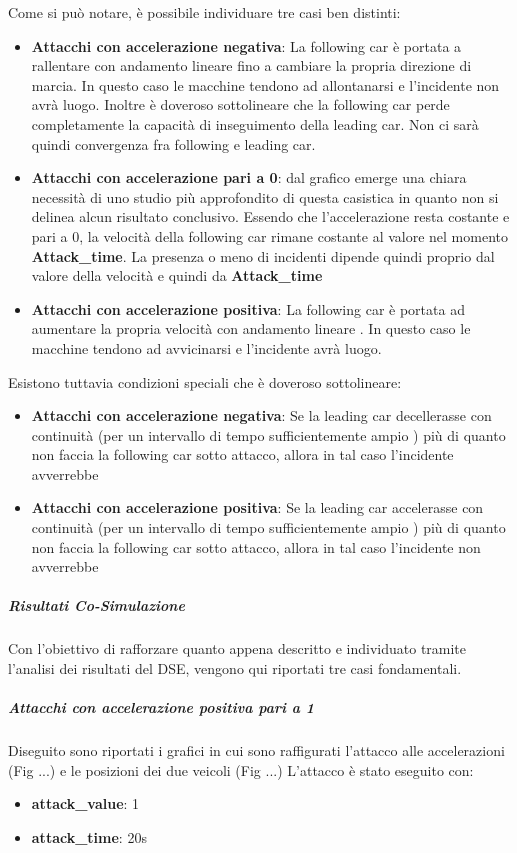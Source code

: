 Come si può notare, è possibile individuare tre casi ben distinti:
\begin{itemize}
	\item \textbf{Attacchi con accelerazione negativa}: La following car è portata a rallentare con andamento lineare fino a cambiare la propria direzione di marcia. In questo caso le macchine tendono ad allontanarsi e l'incidente non avrà luogo. Inoltre è doveroso sottolineare che la following car perde completamente la capacità di inseguimento della leading car. Non ci sarà quindi convergenza fra following e leading car.
	\item \textbf{Attacchi con accelerazione pari a 0}: dal grafico emerge una chiara necessità di uno studio più approfondito di questa casistica in quanto non si delinea alcun risultato conclusivo. Essendo che l'accelerazione resta costante e pari a 0, la velocità della following car rimane costante al valore nel momento \textbf{Attack\_time}. La presenza o meno di incidenti dipende quindi proprio dal valore della velocità e quindi da \textbf{Attack\_time}
	\item \textbf{Attacchi con accelerazione positiva}: La following car è portata ad aumentare la propria velocità con andamento lineare . In questo caso le macchine tendono ad avvicinarsi e l'incidente avrà luogo.
\end{itemize}
Esistono tuttavia condizioni speciali che è doveroso sottolineare:
\begin{itemize}
	\item \textbf{Attacchi con accelerazione negativa}: Se la leading car decellerasse con continuità (per un intervallo di tempo sufficientemente ampio ) più di quanto non faccia la following car sotto attacco, allora in tal caso l'incidente avverrebbe
	\item \textbf{Attacchi con accelerazione positiva}: Se la leading car accelerasse con continuità (per un intervallo di tempo sufficientemente ampio ) più di quanto non faccia la following car sotto attacco, allora in tal caso l'incidente non avverrebbe
\end{itemize}
\subparagraph{Risultati Co-Simulazione}
Con l'obiettivo di rafforzare quanto appena descritto  e individuato tramite l'analisi dei risultati del DSE, vengono qui riportati tre casi fondamentali.
\subparagraph{Attacchi con accelerazione positiva pari a 1} Diseguito sono riportati i grafici in cui sono raffigurati l'attacco alle accelerazioni (Fig ...) e le posizioni dei due veicoli (Fig ...)
L'attacco è stato eseguito con:
\begin{itemize}
	\item \textbf{attack\_value}: 1
	\item \textbf{attack\_time}: 20s
\end{itemize}


